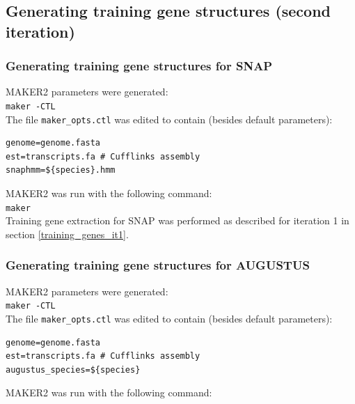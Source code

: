 \documentclass[a4paper,10pt]{report}
\begin{document}

\subsection{Generating training gene structures (second iteration)}

\subsubsection{Generating training gene structures for SNAP}

MAKER2 parameters were generated:\\

\noindent \texttt{maker -CTL}\\

\noindent The file \texttt{maker\_opts.ctl} was edited to contain (besides default parameters):

\begin{verbatim}
genome=genome.fasta
est=transcripts.fa # Cufflinks assembly
snaphmm=${species}.hmm
\end{verbatim}

\noindent MAKER2 was run with the following command:\\

\noindent \texttt{maker}\\

\noindent Training gene extraction for SNAP was performed as described for iteration 1 in section \ref{training_genes_it1}.

\subsubsection{Generating training gene structures for AUGUSTUS}

MAKER2 parameters were generated:\\

\noindent \texttt{maker -CTL}\\

\noindent The file \texttt{maker\_opts.ctl} was edited to contain (besides default parameters):

\begin{verbatim}
genome=genome.fasta
est=transcripts.fa # Cufflinks assembly
augustus_species=${species}
\end{verbatim}

\noindent MAKER2 was run with the following command:\\
\end{document}
